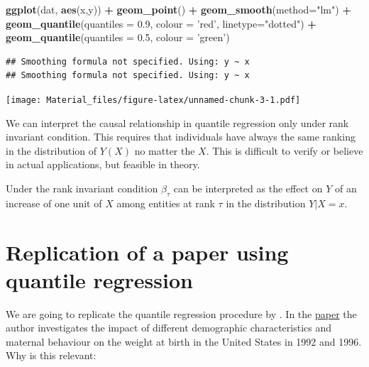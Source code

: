\documentclass[]{book}
\newenvironment{Shaded}{\begin{snugshade}}{\end{snugshade}}
\newcommand{\KeywordTok}[1]{\textcolor[rgb]{0.13,0.29,0.53}{\textbf{#1}}}
\newcommand{\DataTypeTok}[1]{\textcolor[rgb]{0.13,0.29,0.53}{#1}}
\newcommand{\FloatTok}[1]{\textcolor[rgb]{0.00,0.00,0.81}{#1}}
\newcommand{\StringTok}[1]{\textcolor[rgb]{0.31,0.60,0.02}{#1}}
\newcommand{\OperatorTok}[1]{\textcolor[rgb]{0.81,0.36,0.00}{\textbf{#1}}}
\newcommand{\NormalTok}[1]{#1}
\begin{document}
\begin{Shaded}
\begin{Highlighting}[]
\KeywordTok{ggplot}\NormalTok{(dat, }\KeywordTok{aes}\NormalTok{(x,y)) }\OperatorTok{+}\StringTok{ }\KeywordTok{geom_point}\NormalTok{() }\OperatorTok{+}\StringTok{ }\KeywordTok{geom_smooth}\NormalTok{(}\DataTypeTok{method=}\StringTok{"lm"}\NormalTok{) }\OperatorTok{+}\StringTok{ }
\StringTok{        }\KeywordTok{geom_quantile}\NormalTok{(}\DataTypeTok{quantiles =} \FloatTok{0.9}\NormalTok{, }\DataTypeTok{colour =} \StringTok{'red'}\NormalTok{, }\DataTypeTok{linetype=}\StringTok{"dotted"}\NormalTok{) }\OperatorTok{+}
\StringTok{        }\KeywordTok{geom_quantile}\NormalTok{(}\DataTypeTok{quantiles =} \FloatTok{0.5}\NormalTok{, }\DataTypeTok{colour =} \StringTok{'green'}\NormalTok{) }
\end{Highlighting}
\end{Shaded}

\begin{verbatim}
## Smoothing formula not specified. Using: y ~ x
## Smoothing formula not specified. Using: y ~ x
\end{verbatim}

\texttt{[image: Material\_files/figure-latex/unnamed-chunk-3-1.pdf]}

We can interpret the causal relationship in quantile regression only
under rank invariant condition. This requires that individuals have
always the same ranking in the distribution of \(Y(X)\) no matter the
\(X\). This is difficult to verify or believe in actual applications,
but feasible in theory.

Under the rank invariant condition \(\beta_{\tau}\) can be interpreted
as the effect on \(Y\) of an increase of one unit of \(X\) among
entities at rank \(\tau\) in the distribution \(Y|X=x\).

\section{Replication of a paper using quantile
regression}\label{replication-of-a-paper-using-quantile-regression}

We are going to replicate the quantile regression procedure by
\citep{abrevaya2002effects}. In the
\href{https://link.springer.com/article/10.1007/s001810000052}{paper}
the author investigates the impact of different demographic
characteristics and maternal behaviour on the weight at birth in the
United States in 1992 and 1996. Why is this relevant:
\end{document}
